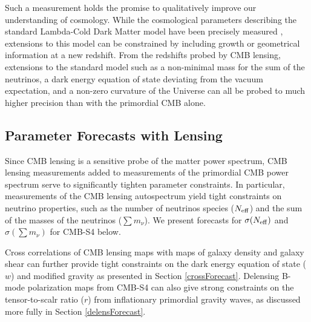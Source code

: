  
 
Such a measurement holds the promise to qualitatively improve our understanding of cosmology.  While the cosmological parameters describing the standard Lambda-Cold Dark Matter model have been precisely measured \cite{planckpapers}, extensions to this model can be constrained by including growth or geometrical information at a new redshift.  From the redshifts probed by CMB lensing, extensions to the standard model such as a non-minimal mass for the sum of the neutrinos, a dark energy equation of state deviating from the vacuum expectation, and a non-zero curvature of the Universe can all be probed to much higher precision than with the primordial CMB alone. 








\subsection{Parameter Forecasts with Lensing}\label{forecast}

Since CMB lensing is a sensitive probe of the matter power spectrum, CMB lensing measurements added to measurements of the primordial CMB power spectrum serve to significantly tighten parameter constraints.  In particular, measurements of the CMB lensing autospectrum yield tight constraints on neutrino properties, such as the number of neutrinos species ($N_{\rm{eff}}$) and the sum of the masses of the neutrinos ($\sum {m_\nu}$).  We present forecasts for $\sigma(N_{\rm{eff}})$ and $\sigma(\sum {m_\nu})$ for CMB-S4 below.  

Cross correlations of CMB lensing maps with maps of galaxy density and galaxy shear can further provide tight constraints on the dark energy equation of state ($w$) and modified gravity as presented in Section \ref{crossForecast}.  Delensing B-mode polarization maps from CMB-S4 can also give strong constraints on the tensor-to-scalr ratio ($r$) from inflationary primordial gravity waves, as discussed more fully in Section \ref{delensForecast}.

